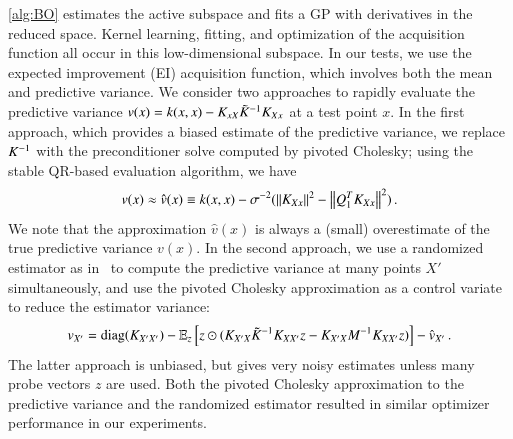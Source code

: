 \cref{alg:BO} estimates the active subspace and fits a GP with derivatives in the
reduced space.  Kernel learning, fitting, and optimization of the acquisition
function all occur in this low\hyp{}dimensional subspace.  In our tests, we use
the expected improvement (EI) acquisition function, which involves both the mean
and predictive variance.  We consider two approaches to rapidly evaluate the
predictive variance $v(x) = k(x,x)-K_{xX} \tilde{K}_{}^{-1} K_{Xx}$ at a test point
$x$.  In the first approach, which provides a biased estimate of the predictive
variance, we replace $K_{}^{-1}$ with the preconditioner solve computed by
pivoted Cholesky; using the stable QR-based evaluation algorithm, we have
\begin{equation}\label{eqn:qrpred}
  v(x) \approx \hat{v}(x) \equiv k(x,x) - \sigma^{-2} (\left\lVert K_{Xx}\right\rVert^2-\left\lVert Q_1^T K_{Xx}\right\rVert^2)\,.
\end{equation}
We note that the approximation $\hat{v}(x)$ is always a (small) overestimate of
the true predictive variance $v(x)$. In the second approach, we use a randomized
estimator as in~\cite{Bekas:2007:EDM} to compute the predictive variance at many
points $X'$ simultaneously, and use the pivoted Cholesky approximation as a
control variate to reduce the estimator variance:
\begin{equation}\label{eqn:predcv}
  v_{X'} = \operatorname{diag}(K_{X'X'}) - \operatorname{\mathbb{E}}_z\left[z \odot (K_{X'X} \tilde{K}_{}^{-1} K_{XX'}z
  - K_{X'X} M^{-1} K_{XX'} z)\right] -\hat{v}_{X'}\,.
\end{equation}
The latter approach is unbiased, but gives very noisy estimates unless many
probe vectors $z$ are used.  Both the pivoted Cholesky approximation to the
predictive variance and the randomized estimator resulted in similar optimizer
performance in our experiments.
 
